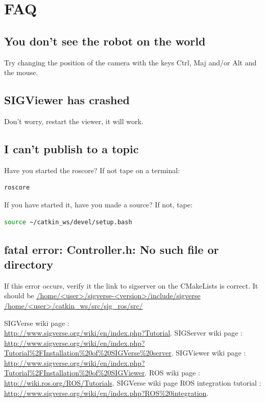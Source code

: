 \documentclass[notitlepage]{report}
\begin{document}
\chapter{FAQ}
\section*{You don't see the robot on the world}
Try changing the position of the camera with the keys Ctrl, Maj and/or Alt and the mouse.
\section*{SIGViewer has crashed}
Don't worry, restart the viewer, it will work.

\section*{I can't publish to a topic}
Have you started the roscore? If not tape on a terminal:
\begin{lstlisting}[language=bash]
roscore
\end{lstlisting} 
If you have started it, have you made a source? If not, tape:
\begin{lstlisting}[language=bash]
source ~/catkin_ws/devel/setup.bash
\end{lstlisting} 

\section*{fatal error: Controller.h: No such file or directory
}
If this error occurs, verify it the link to sigserver on the CMakeLists is correct. It should be \url{/home/<user>/sigverse-<version>/include/sigverse /home/<user>/catkin_ws/src/sig_ros/src/}

\begin{thebibliography}{9}
          SIGVerse wiki page : \\
          \url{http://www.sigverse.org/wiki/en/index.php?Tutorial}.
          SIGServer wiki page : \\
          \url{http://www.sigverse.org/wiki/en/index.php?Tutorial%2FInstallation%20of%20SIGVerse%20server}.
          SIGViewer wiki page : \\
          \url{http://www.sigverse.org/wiki/en/index.php?Tutorial%2FInstallation%20of%20SIGViewer}.
          ROS wiki page :\\
          \url{http://wiki.ros.org/ROS/Tutorials}.
          SIGVerse wiki page ROS integration tutorial :\\
          \url{http://www.sigverse.org/wiki/en/index.php?ROS%20integration}.
     
\end{thebibliography}
\end{document}
